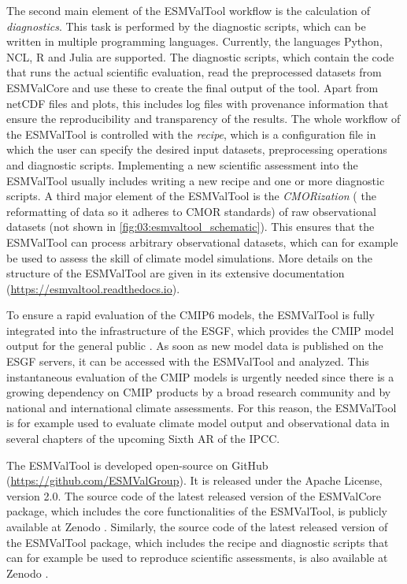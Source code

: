 The second main element of the \ac{ESMValTool} workflow is the calculation of
\emph{diagnostics}. This task is performed by the diagnostic scripts, which can
be written in multiple programming languages. Currently, the languages Python,
NCL, R and Julia are supported. The diagnostic scripts, which contain the code
that runs the actual scientific evaluation, read the preprocessed datasets from
\ac{ESMValCore} and use these to create the final output of the tool. Apart
from \ac{netCDF} files and plots, this includes log files with provenance
information that ensure the reproducibility and transparency of the results.
The whole workflow of the \ac{ESMValTool} is controlled with the \emph{recipe},
which is a configuration file in which the user can specify the desired input
datasets, preprocessing operations and diagnostic scripts. Implementing a new
scientific assessment into the \ac{ESMValTool} usually includes writing a new
recipe and one or more diagnostic scripts. A third major element of the
\ac{ESMValTool} is the \emph{\ac{CMOR}ization} (\ie{} the reformatting of data
so it adheres to \ac{CMOR} standards) of raw observational datasets (not shown
in \cref{fig:03:esmvaltool_schematic}). This ensures that the \ac{ESMValTool}
can process arbitrary observational datasets, which can for example be used to
assess the skill of climate model simulations. More details on the structure of
the \ac{ESMValTool} are given in its extensive documentation
(\url{https://esmvaltool.readthedocs.io}).

To ensure a rapid evaluation of the \acs{CMIP}6 models, the \ac{ESMValTool} is
fully integrated into the infrastructure of the \ac{ESGF}, which provides the
\ac{CMIP} model output for the general public \autocite{Eyring2016b}. As soon
as new model data is published on the \ac{ESGF} servers, it can be accessed
with the \ac{ESMValTool} and analyzed. This instantaneous evaluation of the
\ac{CMIP} models is urgently needed since there is a growing dependency on
\ac{CMIP} products by a broad research community and by national and
international climate assessments. For this reason, the \ac{ESMValTool} is for
example used to evaluate climate model output and observational data in several
chapters of the upcoming Sixth \ac{AR} of the \ac{IPCC}.

The \ac{ESMValTool} is developed open-source on GitHub
(\url{https://github.com/ESMValGroup}). It is released under the Apache
License, version 2.0. The source code of the latest released version of the
\ac{ESMValCore} package, which includes the core functionalities of the
\ac{ESMValTool}, is publicly available at Zenodo \autocite{Andela2020a}.
Similarly, the source code of the latest released version of the
\ac{ESMValTool} package, which includes the recipe and diagnostic scripts that
can for example be used to reproduce scientific assessments, is also available
at Zenodo \autocite{Andela2020}.


